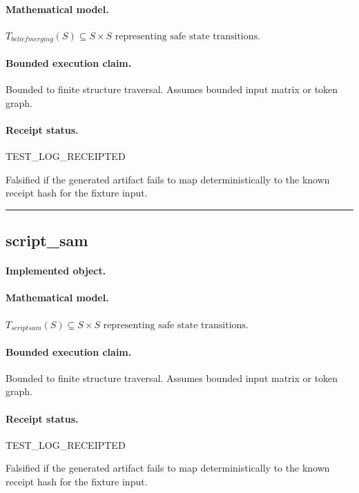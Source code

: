 \paragraph{Mathematical model.} $T_{beliefmerging}(S) \subseteq S \times S \text{ representing safe state transitions}.$
\paragraph{Bounded execution claim.} Bounded to finite structure traversal. Assumes bounded input matrix or token graph.
\paragraph{Receipt status.} TEST\_LOG\_RECEIPTED
\begin{falsifier}
Falsified if the generated artifact fails to map deterministically to the known receipt hash for the fixture input.
\end{falsifier}

\vspace{1em}\hrule\vspace{1em}
\subsection{script\_sam}
\paragraph{Implemented object.} 
\paragraph{Mathematical model.} $T_{scriptsam}(S) \subseteq S \times S \text{ representing safe state transitions}.$
\paragraph{Bounded execution claim.} Bounded to finite structure traversal. Assumes bounded input matrix or token graph.
\paragraph{Receipt status.} TEST\_LOG\_RECEIPTED
\begin{falsifier}
Falsified if the generated artifact fails to map deterministically to the known receipt hash for the fixture input.
\end{falsifier}

